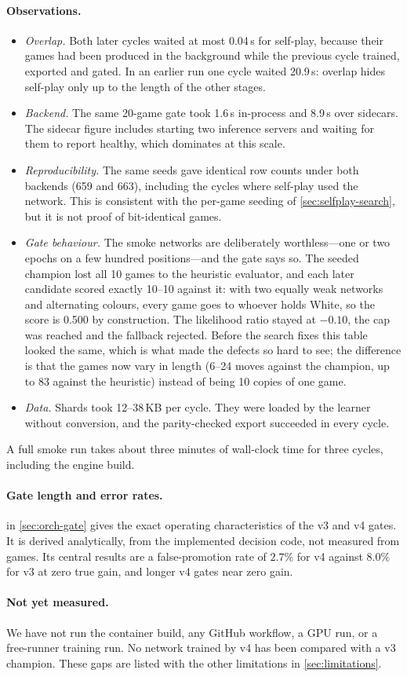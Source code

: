 \paragraph{Observations.}
\begin{itemize}
  \item \emph{Overlap.} Both later cycles waited at most 0.04\,s for self-play, because
        their games had been produced in the background while the previous cycle trained,
        exported and gated. In an earlier run one cycle waited 20.9\,s: overlap hides
        self-play only up to the length of the other stages.
  \item \emph{Backend.} The same 20-game gate took 1.6\,s in-process and 8.9\,s over
        sidecars. The sidecar figure includes starting two inference servers and waiting
        for them to report healthy, which dominates at this scale.
  \item \emph{Reproducibility.} The same seeds gave identical row counts under both
        backends (659 and 663), including the cycles where self-play used the network.
        This is consistent with the per-game seeding of \cref{sec:selfplay-search}, but it
        is not proof of bit-identical games.
  \item \emph{Gate behaviour.} The smoke networks are deliberately worthless---one or two
        epochs on a few hundred positions---and the gate says so. The seeded champion lost
        all 10 games to the heuristic evaluator, and each later candidate scored exactly
        10--10 against it: with two equally weak networks and alternating colours, every
        game goes to whoever holds White, so the score is 0.500 by construction. The
        likelihood ratio stayed at $-0.10$, the cap was reached and the fallback rejected.
        Before the search fixes this table looked the same, which is what made the defects
        so hard to see; the difference is that the games now vary in length (6--24 moves
        against the champion, up to 83 against the heuristic) instead of being 10 copies
        of one game.
  \item \emph{Data.} Shards took 12--38\,KB per cycle. They were loaded by the learner
        without conversion, and the parity-checked export succeeded in every cycle.
\end{itemize}
A full smoke run takes about three minutes of wall-clock time for three cycles, including
the engine build.

\paragraph{Gate length and error rates.}
 in \cref{sec:orch-gate} gives the exact operating characteristics
of the v3 and v4 gates. It is derived analytically, from the implemented decision code,
not measured from games. Its central results are a false-promotion rate of $2.7\%$ for v4
against $8.0\%$ for v3 at zero true gain, and longer v4 gates near zero gain.

\paragraph{Not yet measured.}
We have not run the container build, any GitHub workflow, a GPU run, or a free-runner
training run. No network trained by v4 has been compared with a v3 champion. These gaps
are listed with the other limitations in \cref{sec:limitations}.
